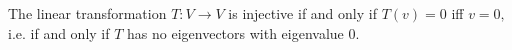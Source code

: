 The linear transformation $T:V\to V$ is injective if and only if $T(v)=0$ iff $v=0,$ i.e. if and only if $T$ has no eigenvectors with eigenvalue $0.$